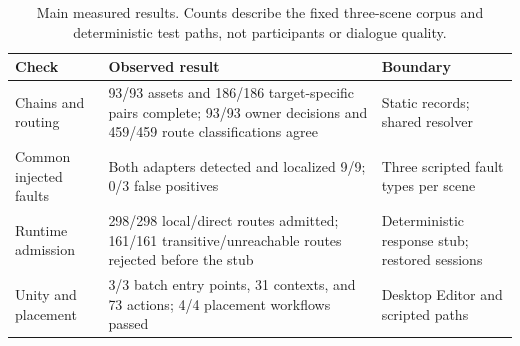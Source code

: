 \begin{table}[t]
  \caption{Main measured results. Counts describe the fixed three-scene corpus
  and deterministic test paths, not participants or dialogue quality.}
  \label{tab:results-summary}
  \centering
  \footnotesize
  \begin{tabular}{@{}p{}p{}p{}@{}}
    \toprule
    Check & Observed result & Boundary \\
    \midrule
    Chains and routing
      & 93/93 assets and 186/186 target-specific pairs complete; 93/93 owner
        decisions and 459/459 route classifications agree
      & Static records; shared resolver \\
    Common injected faults
      & Both adapters detected and localized 9/9; 0/3 false positives
      & Three scripted fault types per scene \\
    Runtime admission
      & 298/298 local/direct routes admitted; 161/161 transitive/unreachable
        routes rejected before the stub
      & Deterministic response stub; restored sessions \\
    Unity and placement
      & 3/3 batch entry points, 31 contexts, and 73 actions; 4/4 placement
        workflows passed
      & Desktop Editor and scripted paths \\
    \bottomrule
  \end{tabular}
\end{table}
